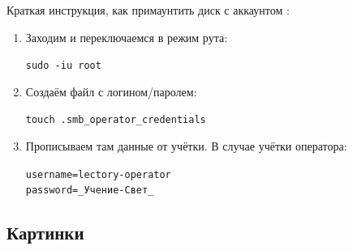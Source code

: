 Краткая инструкция, как примаунтить диск с аккаунтом :
\begin{enumerate}
  \item Заходим и переключаемся в режим рута:
        \begin{tcolorbox}
          \texttt{sudo -iu root}
        \end{tcolorbox}

  \item Создаём файл с логином/паролем:
        \begin{tcolorbox}
          \texttt{touch .smb\_operator\_credentials}
        \end{tcolorbox}

  \item Прописываем там данные от учётки. В случае учётки оператора:
        \begin{tcolorbox}
          \texttt{username=lectory-operator} \\
          \texttt{password=\_Учение-Свет\_}
        \end{tcolorbox}

\end{enumerate}

\subsection{Картинки}

